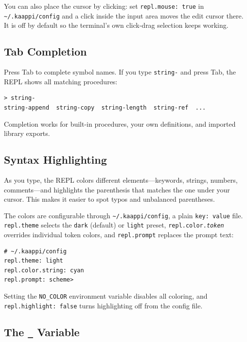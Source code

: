 You can also place the cursor by clicking: set \texttt{repl.mouse: true} in \texttt{\textasciitilde/.kaappi/config} and a click inside the input area moves the edit cursor there. It is off by default so the terminal's own click-drag selection keeps working.

\subsection{Tab Completion}

Press Tab to complete symbol names. If you type \texttt{string-} and press Tab, the REPL shows all matching procedures:

\begin{lstlisting}[style=repl]
> string-
string-append  string-copy  string-length  string-ref  ...
\end{lstlisting}

Completion works for built-in procedures, your own definitions, and imported library exports.

\subsection{Syntax Highlighting}

As you type, the REPL colors different elements---keywords, strings, numbers, comments---and highlights the parenthesis that matches the one under your cursor. This makes it easier to spot typos and unbalanced parentheses.

The colors are configurable through \texttt{\textasciitilde/.kaappi/config}, a plain \texttt{key: value} file. \texttt{repl.theme} selects the \texttt{dark} (default) or \texttt{light} preset, \texttt{repl.color.\emph{token}} overrides individual token colors, and \texttt{repl.prompt} replaces the prompt text:

\begin{Verbatim}[fontsize=\small]
# ~/.kaappi/config
repl.theme: light
repl.color.string: cyan
repl.prompt: scheme>
\end{Verbatim}

Setting the \texttt{NO\_COLOR} environment variable disables all coloring, and \texttt{repl.highlight: false} turns highlighting off from the config file.

\subsection{The \texttt{\_} Variable}

